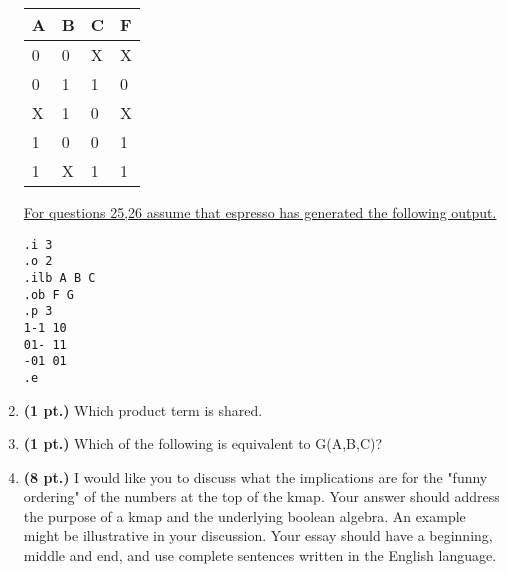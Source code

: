 \documentclass{article}
\begin{document}
\begin{enumerate}
\begin{tabular}{l|l|l||l}
A & B & C & F \\ \hline \hline
0 & 0 & X & X \\ \hline
0 & 1 & 1 & 0 \\ \hline
X & 1 & 0 & X \\ \hline
1 & 0 & 0 & 1 \\ \hline
1 & X & 1 & 1 \\
\end{tabular}


\underline{For questions 25,26 assume that espresso has generated the following output.}
\begin{verbatim}
.i 3
.o 2
.ilb A B C
.ob F G
.p 3
1-1 10
01- 11
-01 01
.e
\end{verbatim}

\item{\bf (1 pt.)}  Which product term is shared.

\item{\bf (1 pt.)}  Which of the following is equivalent to G(A,B,C)?

\pagebreak
\item{\bf (8 pt.)} I would like you to discuss what the implications
are for the "funny ordering" of the numbers at the top of the kmap.
Your answer should address the purpose of a kmap and the underlying
boolean algebra.  An example might be illustrative in your discussion.
Your essay should have a beginning, middle and end, and use complete
sentences written in the English language. \\


\end{enumerate}
\end{document}
